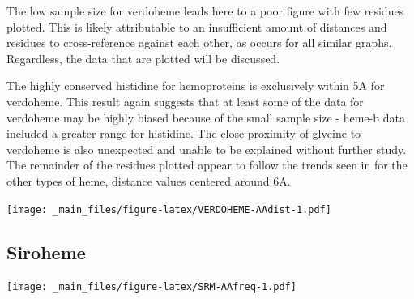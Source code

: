 \documentclass[a4paper, nobind]{templates/ociamthesis}
\let\origfigure\figure
\let\endorigfigure\endfigure
\renewenvironment{figure}[1][2] {
    \expandafter\origfigure\expandafter[H]
} {
    \endorigfigure
}
\begin{document}
The low sample size for verdoheme leads here to a poor figure with few residues plotted. This is likely attributable to an insufficient amount of distances and residues to cross-reference against each other, as occurs for all similar graphs. Regardless, the data that are plotted will be discussed.

The highly conserved histidine for hemoproteins is exclusively within 5A for verdoheme. This result again suggests that at least some of the data for verdoheme may be highly biased because of the small sample size - heme-b data included a greater range for histidine. The close proximity of glycine to verdoheme is also unexpected and unable to be explained without further study. The remainder of the residues plotted appear to follow the trends seen in for the other types of heme, distance values centered around 6A.

\begin{figure}
\centering
\texttt{[image: \_main\_files/figure-latex/VERDOHEME-AAdist-1.pdf]}
\caption{\label{fig:VERDOHEME-AAdist}VERDOHEME: AA Distances}
\end{figure}

\hypertarget{siroheme-1}{%
\subsection{Siroheme}\label{siroheme-1}}

\begin{figure}
\centering
\texttt{[image: \_main\_files/figure-latex/SRM-AAfreq-1.pdf]}
\caption{\label{fig:SRM-AAfreq}SRM: AA Frequency}
\end{figure}
\end{document}
